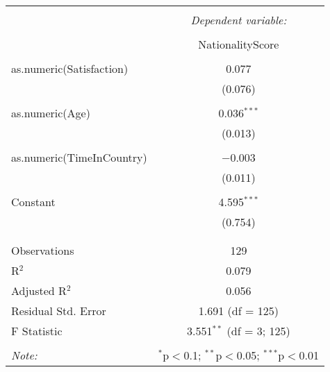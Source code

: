 \documentclass{article}
\begin{document}
\begin{table}[!htbp] \centering 
  \caption{} 
  \label{} 
\begin{tabular}{@{\extracolsep{5pt}}lc} 
\\[-1.8ex]\hline 
\hline \\[-1.8ex] 
 & \multicolumn{1}{c}{\textit{Dependent variable:}} \\ 
\cline{2-2} 
\\[-1.8ex] & NationalityScore \\ 
\hline \\[-1.8ex] 
 as.numeric(Satisfaction) & 0.077 \\ 
  & (0.076) \\ 
  & \\ 
 as.numeric(Age) & 0.036$^{***}$ \\ 
  & (0.013) \\ 
  & \\ 
 as.numeric(TimeInCountry) & $-$0.003 \\ 
  & (0.011) \\ 
  & \\ 
 Constant & 4.595$^{***}$ \\ 
  & (0.754) \\ 
  & \\ 
\hline \\[-1.8ex] 
Observations & 129 \\ 
R$^{2}$ & 0.079 \\ 
Adjusted R$^{2}$ & 0.056 \\ 
Residual Std. Error & 1.691 (df = 125) \\ 
F Statistic & 3.551$^{**}$ (df = 3; 125) \\ 
\hline 
\hline \\[-1.8ex] 
\textit{Note:}  & \multicolumn{1}{r}{$^{*}$p$<$0.1; $^{**}$p$<$0.05; $^{***}$p$<$0.01} \\ 
\end{tabular} 
\end{table} 
\end{document}
